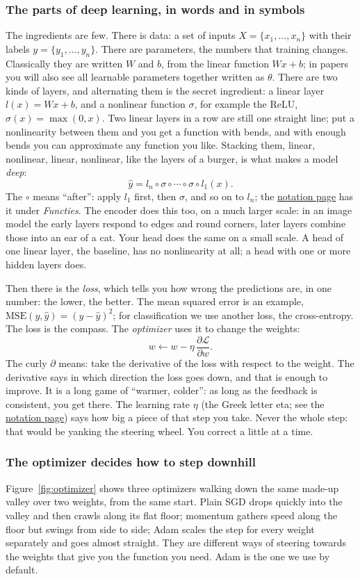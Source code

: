 \documentclass[12pt, a4paper]{article}
\theoremstyle{definition}
\theoremstyle{remark}
\newcommand{\loss}{\mathcal{L}}
\newcommand{\notationurl}{https://raoulg.github.io/MADS-MachineLearning-course/notatie.html}
\newcommand{\notationpage}{\href{\notationurl}{notation page}}
\begin{document}
\subsubsection{The parts of deep learning, in words and in symbols}
The ingredients are few. There is data: a set of inputs $X = \{x_1, \dots, x_n\}$ with their labels $y = \{y_1, \dots, y_n\}$. There are parameters, the numbers that training changes. Classically they are written $W$ and $b$, from the linear function $Wx + b$; in papers you will also see all learnable parameters together written as $\theta$. There are two kinds of layers, and alternating them is the secret ingredient: a linear layer $l(x) = Wx + b$, and a nonlinear function $\sigma$, for example the ReLU, $\sigma(x) = \max(0, x)$. Two linear layers in a row are still one straight line; put a nonlinearity between them and you get a function with bends, and with enough bends you can approximate any function you like. Stacking them, linear, nonlinear, linear, nonlinear, like the layers of a burger, is what makes a model \emph{deep}:
\[
\hat y = l_n \circ \sigma \circ \cdots \circ \sigma \circ l_1(x).
\]
The $\circ$ means ``after'': apply $l_1$ first, then $\sigma$, and so on to $l_n$; the \notationpage{} has it under \emph{Functies}.
The encoder does this too, on a much larger scale: in an image model the early layers respond to edges and round corners, later layers combine those into an ear of a cat. Your head does the same on a small scale. A head of one linear layer, the baseline, has no nonlinearity at all; a head with one or more hidden layers does.

Then there is the \emph{loss}, which tells you how wrong the predictions are, in one number: the lower, the better. The mean squared error is an example, $\mathrm{MSE}(y, \hat y) = (y - \hat y)^2$; for classification we use another loss, the cross-entropy. The loss is the compass. The \emph{optimizer} uses it to change the weights:
\[
w \leftarrow w - \eta\, \frac{\partial \loss}{\partial w}.
\]
The curly $\partial$ means: take the derivative of the loss with respect to the weight. The derivative says in which direction the loss goes down, and that is enough to improve. It is a long game of ``warmer, colder'': as long as the feedback is consistent, you get there. The learning rate $\eta$ (the Greek letter eta; see the \notationpage) says how big a piece of that step you take. Never the whole step: that would be yanking the steering wheel. You correct a little at a time.

\subsubsection{The optimizer decides how to step downhill}
Figure~\ref{fig:optimizer} shows three optimizers walking down the same made-up valley over two weights, from the same start. Plain SGD drops quickly into the valley and then crawls along its flat floor; momentum gathers speed along the floor but swings from side to side; Adam scales the step for every weight separately and goes almost straight. They are different ways of steering towards the weights that give you the function you need. Adam is the one we use by default.
\end{document}
